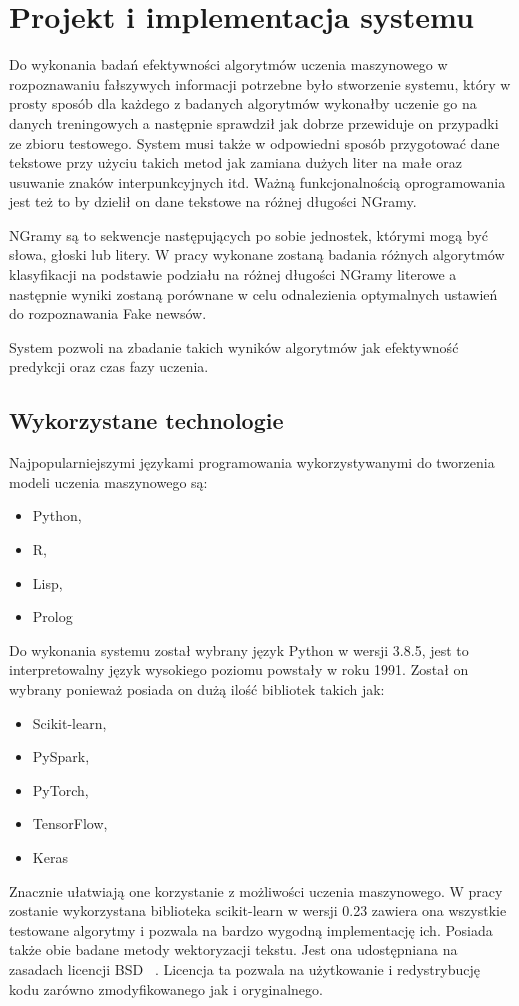 \chapter{Projekt i implementacja systemu}
Do wykonania badań efektywności algorytmów uczenia maszynowego w rozpoznawaniu
fałszywych informacji potrzebne było stworzenie systemu, który w prosty sposób 
dla każdego z badanych algorytmów wykonałby uczenie go na danych treningowych 
a następnie sprawdził jak dobrze przewiduje on przypadki ze zbioru testowego.
System musi także w odpowiedni sposób przygotować dane tekstowe przy użyciu takich
metod jak zamiana dużych liter na małe oraz usuwanie znaków interpunkcyjnych itd.
Ważną funkcjonalnością oprogramowania jest też to by dzielił on dane tekstowe na 
różnej długości NGramy. 

NGramy są to sekwencje następujących po sobie jednostek, którymi mogą być słowa, 
głoski lub litery. W pracy wykonane zostaną badania różnych algorytmów klasyfikacji
na podstawie podziału na różnej długości NGramy literowe a następnie wyniki zostaną
porównane w celu odnalezienia optymalnych ustawień do rozpoznawania Fake newsów.

System pozwoli na zbadanie takich wyników algorytmów jak efektywność predykcji oraz 
czas fazy uczenia.

\section{Wykorzystane technologie}
Najpopularniejszymi językami programowania wykorzystywanymi do tworzenia modeli uczenia
maszynowego są:
\begin{itemize}
    \item Python,
    \item R,
    \item Lisp,
    \item Prolog
\end{itemize}
Do wykonania systemu został wybrany język Python w wersji 3.8.5, jest to interpretowalny
język wysokiego poziomu powstały w roku 1991. Został on wybrany 
ponieważ posiada on dużą ilość bibliotek takich jak: 
\begin{itemize}
    \item Scikit-learn,
    \item PySpark,
    \item PyTorch,
    \item TensorFlow,
    \item Keras
\end{itemize}
Znacznie ułatwiają one korzystanie z możliwości uczenia maszynowego.
W pracy zostanie wykorzystana biblioteka scikit-learn w wersji 0.23 zawiera ona wszystkie 
testowane algorytmy i pozwala na bardzo wygodną implementację ich. Posiada także obie 
badane metody wektoryzacji tekstu. Jest ona udostępniana na zasadach licencji BSD ~\cite{scikitlearn}. 
Licencja ta pozwala na użytkowanie i redystrybucję kodu zarówno zmodyfikowanego jak i oryginalnego.

